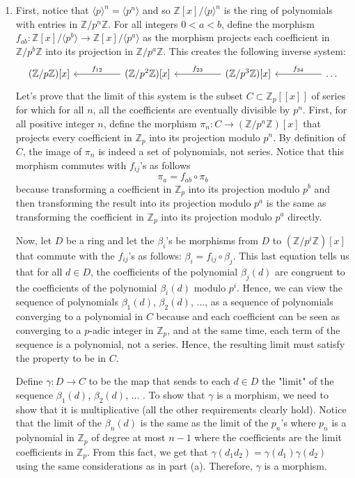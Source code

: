 \documentclass{article}
\newcommand{\Z}{\mathbb{Z}}
\newcommand{\Zn}[1]{\mathbb{Z}/ #1 \mathbb{Z}}
\begin{document}
\begin{enumerate}[label=(\alph*)]
    \item First, notice that $\langle p \rangle^n = \langle p^n \rangle$ and so $\Z[x]/\langle p \rangle^n$ is the ring of polynomials with entries in $\Zn{p^n}$. For all integers $0 < a < b$, define the morphism $f_{ab} : \Z[x]/\langle p^b \rangle \to \Z[x]/\langle p^a \rangle$ as the morphism projects each coefficient in $\Zn{p^b}$ into its projection in $\Zn{p^a}$. This creates the following inverse system:
    \[\begin{tikzcd}
	{(\Zn{p})[x]} && {(\Zn{p^2})[x]} && {(\Zn{p^3})[x]} && \dots
	\arrow["{f_{12}}"', from=1-3, to=1-1]
	\arrow["{f_{23}}"', from=1-5, to=1-3]
	\arrow["{f_{34}}"', from=1-7, to=1-5]
    \end{tikzcd}\]
    Let's prove that the limit of this system is the subset $C \subset\Z_p[[x]]$ of series for which for all $n$, all the coefficients are eventually divisible by $p^n$. First, for all positive integer $n$, define the morphism $\pi_n : C \to (\Zn{p^n})[x]$ that projects every coefficient in $\Z_p$ into its projection modulo $p^n$. By definition of $C$, the image of $\pi_n$ is indeed a set of polynomials, not series. Notice that this morphism commutes with $f_{ij}$'s as follows
    $$\pi_a = f_{ab} \circ \pi_b$$
    because transforming a coefficient in $\Z_p$ into its projection modulo $p^b$ and then transforming the result into its projection modulo $p^a$ is the same as transforming the coefficient in $\Z_p$ into its projection modulo $p^a$ directly.

    Now, let $D$ be a ring and let the $\beta_i$'s be morphisms from $D$ to $(\Zn{p^i})[x]$ that commute with the $f_{ij}$'s as follows: $\beta_i = f_{ij} \circ \beta_j$. This last equation tells us that for all $d \in D$, the coefficients of the polynomial $\beta_j(d)$ are congruent to the coefficients of the polynomial $\beta_i(d)$ modulo $p^i$. Hence, we can view the sequence of polynomials $\beta_1(d)$, $\beta_2(d)$, ..., as a sequence of polynomials converging to a polynomial in $C$ because and each coefficient can be seen as converging to a $p$-adic integer in $\Z_p$, and at the same time, each term of the sequence is a polynomial, not a series. Hence, the resulting limit must satisfy the property to be in $C$.
    
    Define $\gamma : D \to C$ to be the map that sends to each $d \in D$ the "limit" of the sequence $\beta_1(d)$, $\beta_2(d)$, ... . To show that $\gamma$ is a morphism, we need to show that it is multiplicative (all the other requirements clearly hold). Notice that the limit of the $\beta_n(d)$ is the same as the limit of the $p_n$'s where $p_n$ is a polynomial in $\Z_p$ of degree at most $n-1$ where the coefficients are the limit coefficients in $\Z_p$. From this fact, we get that $\gamma(d_1d_2) = \gamma(d_1)\gamma(d_2)$ using the same considerations as in part (a). Therefore, $\gamma$ is a morphism.


\end{enumerate}
\end{document}
